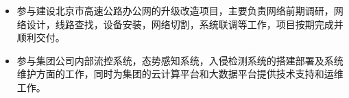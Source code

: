 \documentclass{resume}
\begin{document}
\begin{itemize}
  \item 参与建设北京市高速公路办公网的升级改造项目，主要负责网络前期调研，网络设计，线路查找，设备安装，网络切割，系统联调等工作，项目按期完成并顺利交付。 
  \item 参与集团公司内部流控系统，态势感知系统，入侵检测系统的搭建部署及系统维护方面的工作，同时为集团的云计算平台和大数据平台提供技术支持和运维工作。
\end{itemize}




\end{document}
